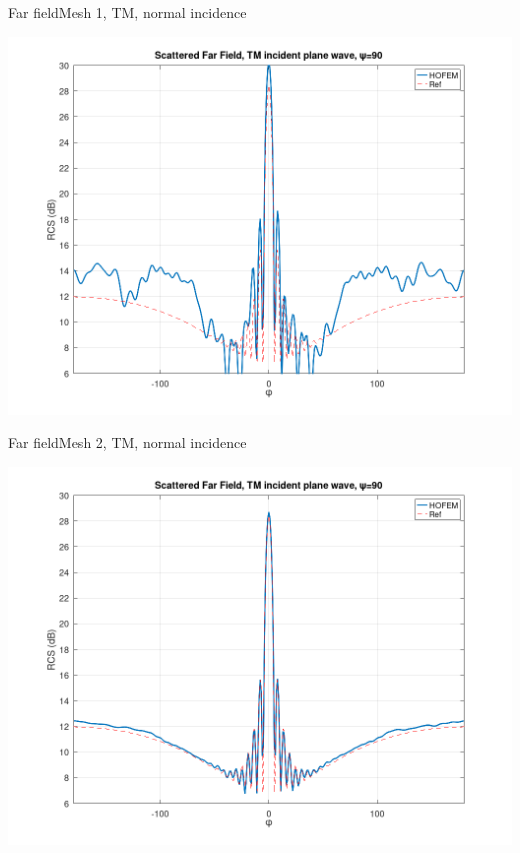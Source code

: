 
\begin{frame}{Far field}{Mesh 1, TM, normal incidence}

\includegraphics[width=0.9\linewidth]{results/pec_y_malla_gorda_90_TM/FF.png}
  
\end{frame}
  

\begin{frame}{Far field}{Mesh 2, TM, normal incidence}

\includegraphics[width=0.9\linewidth]{results/pec_y_malla_fina_90_TM/FF.png}
  
\end{frame}

